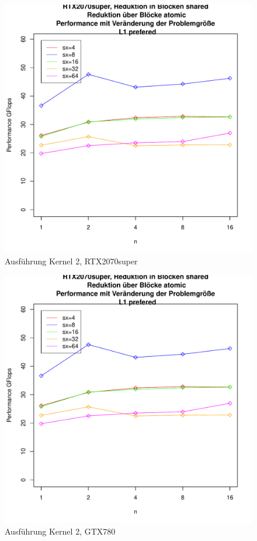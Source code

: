 \documentclass[10pt,a4paper]{article}
\begin{document}
	\begin{figure}
		\includegraphics[page=2,scale=0.8]{../Diagramme/sharedatomic_chagei.pdf}
		
		\caption{Ausführung Kernel 2, RTX2070super }
		\label{Ausführung Kernel2, RTX2070super }
	\end{figure}

	\begin{figure}
		\includegraphics[page=5,scale=0.8]{../Diagramme/sharedatomic_chagei.pdf}
		
		\caption{Ausführung Kernel 2, GTX780 }
		\label{Ausführung Kernel2, GTX780 }
	\end{figure}
	
\end{document}
